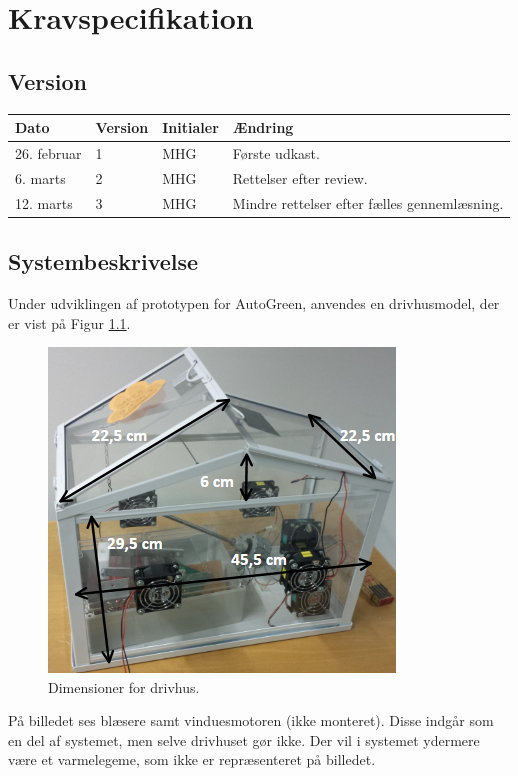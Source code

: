 \chapter{Kravspecifikation} \label{ch:Kravspec}

\section{Version}
\begin{table}[h]
	\centering
	\begin{tabularx}{\textwidth - 2cm}{|l|l|l|X|}
	\hline
	Dato	& Version	& Initialer & Ændring	\\ \hline
	26. februar & 1 & MHG & Første udkast. \\ \hline
	6. marts & 2 & MHG & Rettelser efter review. \\ \hline
	12. marts & 3 & MHG & Mindre rettelser efter fælles gennemlæsning. \\\hline
	\end{tabularx}
\end{table}

\section{Systembeskrivelse}
Under udviklingen af prototypen for AutoGreen, anvendes en drivhusmodel, der er vist på Figur \ref{fig:dimensioner}.

\begin{figure}[!h]
\centering 
\includegraphics[scale=0.9] {../fig/dimensioner.png}
\caption{Dimensioner for drivhus.}
\label{fig:dimensioner}
\end{figure}

På billedet ses blæsere samt vinduesmotoren (ikke monteret). Disse indgår som en del af systemet, men selve drivhuset gør ikke. Der vil i systemet ydermere være et varmelegeme, som ikke er repræsenteret på billedet. 

